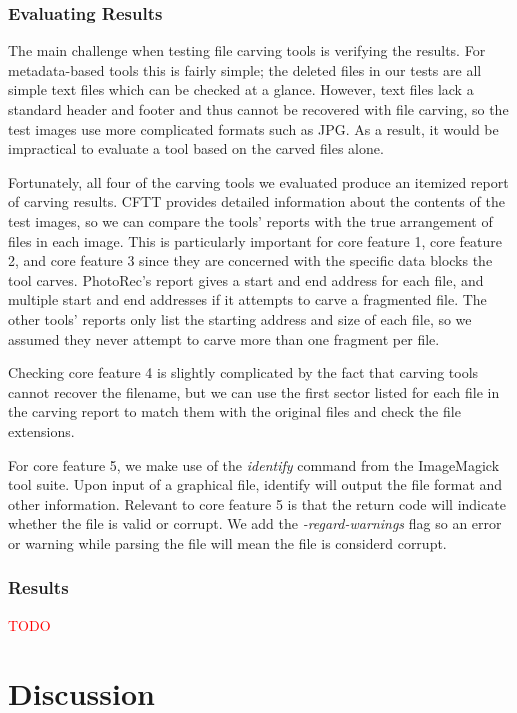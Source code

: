 \documentclass{ws-rv9x6}
\newcommand{\TODO}[1]{\textcolor{red}{#1}} %
\begin{document}
\subsubsection{Evaluating Results}
The main challenge when testing file carving tools is verifying the results. 
For metadata-based tools this is fairly simple; the deleted files in our tests are all simple text files which can be checked at a glance.
However, text files lack a standard header and footer and thus cannot be recovered with file carving, so the test images use more complicated formats such as JPG.
As a result, it would be impractical to evaluate a tool based on the carved files alone.

Fortunately, all four of the carving tools we evaluated produce an itemized report of carving results. CFTT provides detailed information about the contents of the test images, so we can compare the tools' reports with the true arrangement of files in each image. This is particularly important for core feature 1, core feature 2, and core feature 3 since they are concerned with the specific data blocks the tool carves. PhotoRec's report gives a start and end address for each file, and multiple start and end addresses if it attempts to carve a fragmented file. The other tools' reports only list the starting address and size of each file, so we assumed they never attempt to carve more than one fragment per file.

Checking core feature 4 is slightly complicated by the fact that carving tools cannot recover the filename, but we can use the first sector listed for each file in the carving report to match them with the original files and check the file extensions.

For core feature 5, we make use of the \emph{identify} command from the ImageMagick~\cite{imagemagick} tool suite. Upon input of a graphical file, identify will output the file format and other information. Relevant to core feature 5 is that the return code will indicate whether the file is valid or corrupt. We add the \emph{-regard-warnings} flag so an error or warning while parsing the file will mean the file is considerd corrupt.

\subsubsection{Results}

\TODO{TODO}


\section{Discussion}
\end{document}
